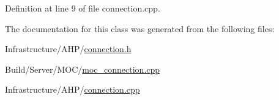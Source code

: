Definition at line 9 of file connection.\+cpp.



The documentation for this class was generated from the following files\+:\begin{DoxyCompactItemize}
\item 
Infrastructure/\+A\+H\+P/\hyperlink{connection_8h}{connection.\+h}\item 
Build/\+Server/\+M\+O\+C/\hyperlink{moc__connection_8cpp}{moc\+\_\+connection.\+cpp}\item 
Infrastructure/\+A\+H\+P/\hyperlink{connection_8cpp}{connection.\+cpp}\end{DoxyCompactItemize}
